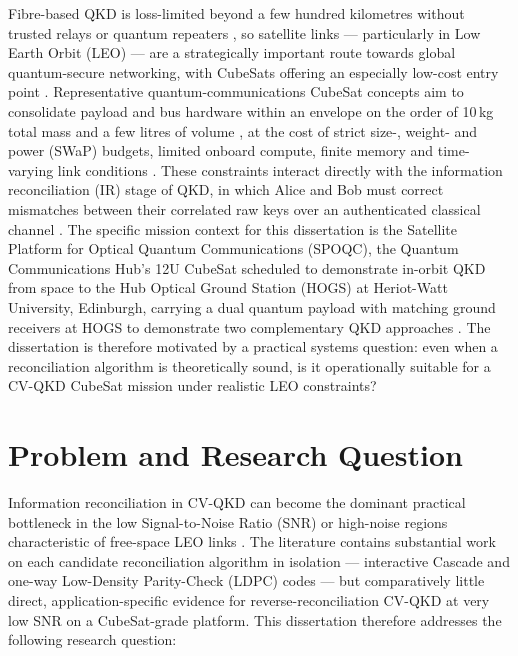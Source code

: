 \documentclass{UoYCSproject}
\begin{document}
Fibre-based QKD is loss-limited beyond a few hundred kilometres without
trusted relays or quantum repeaters \cite{lauterbach_study_2023,
neumann_quantum_2017, podmore_qkd_2021}, so satellite links --- particularly
in Low Earth Orbit (LEO) --- are a strategically important route towards
global quantum-secure networking, with CubeSats offering an especially
low-cost entry point \cite{oi_cubesat_2017, lauterbach_study_2023,
alvaro_space_2025, bouzoukis_overview_2025}. Representative
quantum-communications CubeSat concepts aim to consolidate payload and bus
hardware within an envelope on the order of 10\,kg total mass and a few
litres of volume \cite{oi_cubesat_2017}, at the cost of strict
size-, weight- and power (SWaP) budgets, limited onboard compute, finite
memory and time-varying link conditions \cite{oi_cubesat_2017,
sivasankaran_cubesat_2022}. These constraints interact directly with the
information reconciliation (IR) stage of QKD, in which Alice and Bob must
correct mismatches between their correlated raw keys over an authenticated
classical channel \cite{laudenbach_continuous-variable_2018,
mueller_performance_2025}. The specific mission context for this dissertation
is the Satellite Platform for Optical Quantum Communications (SPOQC), the
Quantum Communications Hub's 12U CubeSat scheduled to demonstrate in-orbit
QKD from space to the Hub Optical Ground Station (HOGS)
at Heriot-Watt University, Edinburgh, carrying a dual quantum payload with
matching ground receivers at HOGS to demonstrate two complementary QKD
approaches \cite{noauthor_hubs_nodate, simmons_hogs_2025}. The dissertation
is therefore motivated by a practical systems question: even when a
reconciliation algorithm is theoretically sound, is it operationally suitable
for a CV-QKD CubeSat mission under realistic LEO constraints?

\section{Problem and Research Question}
\label{sec:research-question}

Information reconciliation in CV-QKD can become the dominant practical
bottleneck in the low Signal-to-Noise Ratio (SNR) or high-noise regions
characteristic of free-space LEO links \cite{milicevic_quasi-cyclic_2018,
gumus_novel_2021, mueller_performance_2025}. The literature contains
substantial work on each candidate reconciliation algorithm in isolation ---
interactive Cascade and one-way Low-Density Parity-Check (LDPC) codes --- but
comparatively little direct, application-specific evidence for
reverse-reconciliation CV-QKD at very low SNR on a CubeSat-grade platform. 
This dissertation therefore addresses the following research question:
\end{document}
